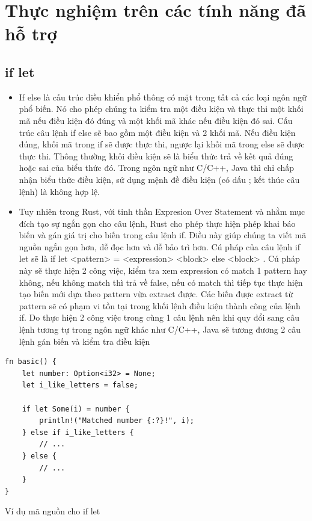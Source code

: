 \section{Thực nghiệm trên các tính năng đã hỗ trợ}

\subsection{if let}


\begin{itemize}
    \item If else là cấu trúc điều khiển phổ thông có mặt trong tất cả các loại ngôn ngữ phổ biến. Nó cho phép chúng ta kiểm tra một điều kiện và thực thi một khối mã nếu điều kiện đó đúng và một khối mã khác nếu điều kiện đó sai. Cấu trúc câu lệnh if else sẽ bao gồm một điều kiện và 2 khối mã. Nếu điều kiện đúng, khối mã trong if sẽ được thực thi, ngược lại khối mã trong else sẽ được thực thi. Thông thường khối điều kiện sẽ là biểu thức trả về kết quả đúng hoặc sai của biểu thức đó. Trong ngôn ngữ như C/C++, Java thì chỉ chấp nhận biểu thức điều kiện, sử dụng mệnh đề điều kiện (có dấu ; kết thúc câu lệnh) là không hợp lệ.
    \item Tuy nhiên trong Rust, với tinh thần Expresion Over Statement và nhằm mục đích tạo sự ngắn gọn cho câu lệnh, Rust cho phép thực hiện phép khai báo biến và gán giá trị cho biến trong câu lệnh if. Điều này giúp chúng ta viết mã nguồn ngắn gọn hơn, dễ đọc hơn và dễ bảo trì hơn. Cú pháp của câu lệnh if let sẽ là if let <pattern> = <expression> { <block> } else { <block> }. Cú pháp này sẽ thực hiện 2 công việc, kiểm tra xem expression có match 1 pattern hay không, nếu không match thì trả về false, nếu có match thì tiếp tục thực hiện tạo biến mới dựa theo pattern vừa extract được. Các biến được extract từ pattern sẽ có phạm vi tồn tại trong khối lệnh điều kiện thành công của lệnh if. Do thực hiện 2 công việc trong cùng 1 câu lệnh nên khi quy đổi sang câu lệnh tương tự trong ngôn ngữ khác như C/C++, Java sẽ tương đương 2 câu lệnh gán biến và kiểm tra điều kiện
\end{itemize}

\begin{listing}[H]
\begin{verbatim}
fn basic() {
    let number: Option<i32> = None;
    let i_like_letters = false;

    if let Some(i) = number {
        println!("Matched number {:?}!", i);
    } else if i_like_letters {
        // ...
    } else {
        // ...
    }
}
\end{verbatim}
\caption{Ví dụ mã nguồn cho if let}
\label{code:c3_iflet}
\end{listing}

